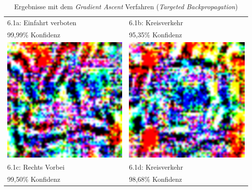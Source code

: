 \begin{table}
\begin{tabular}{p{4.4cm}p{4.4cm}}
	6.1a: Einfahrt verboten & 6.1b: Kreisverkehr \\
	99,99\% Konfidenz&95,35\% Konfidenz\\
	\includegraphics[width=\linewidth]{Images/AnPe/39_RechtsVorbeiOrigLinksvorbei} &\includegraphics[width=\linewidth]{Images/AnPe/40_kreisverkehr}  \\
	6.1c: Rechts Vorbei&6.1d: Kreisverkehr\\
	99,50\% Konfidenz&98,68\% Konfidenz\\
\end{tabular}

\caption{Ergebnisse mit dem \textit{Gradient Ascent} Verfahren (\textit{Targeted Backpropagation})}
\label{tab:gasc1}
\end{table}

